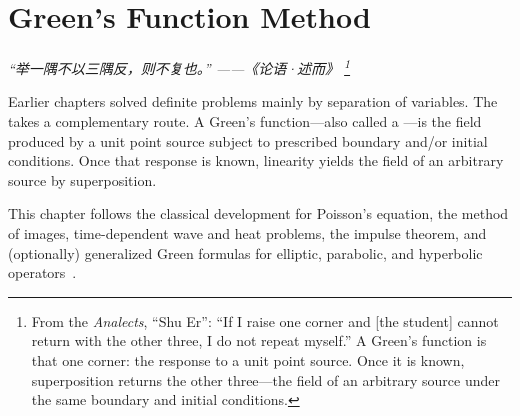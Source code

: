\chapter{Green's Function Method}
\renewcommand{\currentchapterpath}{chapters/gf/}

\begin{flushright}
\textit{“举一隅不以三隅反，则不复也。” ——《论语·述而》
\footnote{From the \textit{Analects}, ``Shu Er'': ``If I raise one corner and [the student] cannot return with the other three, I do not repeat myself.'' A Green's function is that one corner: the response to a unit point source. Once it is known, superposition returns the other three---the field of an arbitrary source under the same boundary and initial conditions.}}
\end{flushright}

Earlier chapters solved definite problems mainly by separation of variables. The  takes a complementary route. A Green's function---also called a ---is the field produced by a unit point source subject to prescribed boundary and/or initial conditions. Once that response is known, linearity yields the field of an arbitrary source by superposition.

This chapter follows the classical development for Poisson's equation, the method of images, time-dependent wave and heat problems, the impulse theorem, and (optionally) generalized Green formulas for elliptic, parabolic, and hyperbolic operators~\cite{green1828,duffy,stakgold,jackson}.

